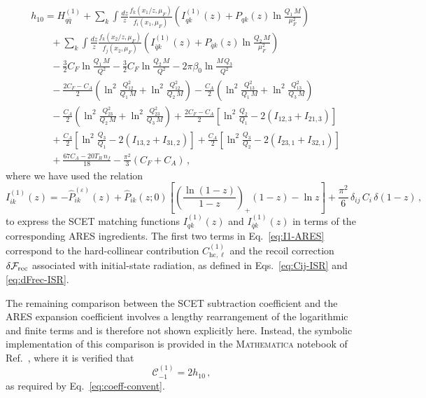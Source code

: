 \begin{equation}
\begin{aligned}
&h_{10}=H_{q\bar{q}}^{(1)}+\sum_{k}\int\frac{dz}{z} \frac{f_k(x_1/z,\mu_F)}{f_i(x_1,\mu_F)}\left(I_{qk}^{(1)}(z)+P_{qk}(z)\ln\frac{Q_1\,M}{\mu_F^2}\right)\\[0.5ex]
&\qquad+\sum_{k}\int\frac{dz}{z} \frac{f_k(x_2/z,\mu_F)}{f_j(x_2,\mu_F)}\left(I_{\bar{q}k}^{(1)}(z)+P_{\bar{q}k}(z)\ln\frac{Q_2\,M}{\mu_F^2}\right)\\[0.5ex]
&\qquad-\frac{3}{2}C_F\ln\frac{Q_1\,M}{Q^2}-\frac{3}{2}C_F\ln\frac{Q_2\,M}{Q^2}-2\pi\beta_0\ln\frac{M\,Q_3}{Q^2}\\[0.5ex]
    &\qquad-\frac{2C_F-C_A}{2}\left(\ln^2\frac{Q_{12}^2}{Q_1\,M}+\ln^2\frac{Q_{12}^2}{Q_2\,M}\right)-\frac{C_A}{2}\left(\ln^2\frac{Q_{13}^2}{Q_1\,M}+\ln^2\frac{Q_{13}^2}{Q_3\,M}\right)\\[0.5ex]
&\qquad-\frac{C_A}{2}\left(\ln^2\frac{Q_{23}^2}{Q_2\,M}+\ln^2\frac{Q_{23}^2}{Q_3\,M}\right)+\frac{2C_F-C_A}{2}\left[\ln^2\frac{Q_2}{Q_1}-2(I_{12,3}+I_{21,3})\right]\\[0.5ex]
&\qquad+\frac{C_A}{2}\left[\ln^2\frac{Q_3}{Q_1}-2(I_{13,2}+I_{31,2})\right]+\frac{C_A}{2}\left[\ln^2\frac{Q_3}{Q_2}-2(I_{23,1}+I_{32,1})\right]\\[0.5ex]
&\qquad +\frac{67C_A-20 T_R\,n_f}{18}-\frac{\pi^2}{3}(C_F+C_A)\,,
\end{aligned}
\end{equation}
where we have used the relation
\begin{equation}
\label{eq:I1-ARES}
I_{ik}^{(1)}(z) =
-\hat{P}_{ik}^{(\varepsilon)}(z)
+\hat{P}_{ik}(z;0)\!\left[
\left(\frac{\ln(1-z)}{1-z}\right)_{\!\!+}(1-z)
-\ln z\right]
+\frac{\pi^2}{6}\,\delta_{ij}\,C_i\,\delta(1-z)\,,
\end{equation}
to express the SCET matching functions $I_{qk}^{(1)}(z)$ and
$I_{\bar{q}k}^{(1)}(z)$ in terms of the corresponding \textsc{ARES}
ingredients. The first two terms in Eq.~\eqref{eq:I1-ARES} correspond to
the hard-collinear contribution $C_{\mathrm{hc},\ell}^{(1)}$ and the
recoil correction $\delta\mathcal{F}_{\rm rec}$ associated with
initial-state radiation, as defined in Eqs.~\eqref{eq:Cij-ISR} and
\eqref{eq:dFrec-ISR}.

The remaining comparison between the SCET subtraction coefficient and the
\textsc{ARES} expansion coefficient involves a lengthy rearrangement of
the logarithmic and finite terms and is therefore not shown explicitly
here. Instead, the symbolic implementation of this comparison is provided
in the \textsc{Mathematica} notebook of Ref.~\cite{peake2026validation},
where it is verified that
\begin{equation}
    \mathcal{C}^{(1)}_{-1}=2h_{10}\,,
\end{equation}
as required by Eq.~\eqref{eq:coeff-convent}.

